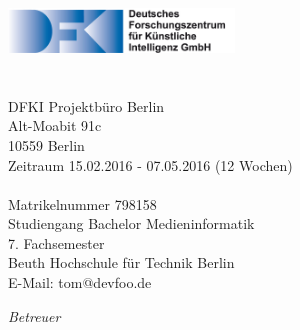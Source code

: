 \begin{titlepage}
	\tgherosfont
	\centering

	{\Large \thesisUniversity} \\[4mm]
	\includegraphics[width=6cm]{gfx/DFKI_Schrift_de} \\[2mm]
	\textsf{\thesisUniversityDepartment} \\
	\textsf{\thesisUniversityInstitute} \\[5mm]
    {\normalsize DFKI Projektbüro Berlin}\\
    {\normalsize Alt-Moabit 91c}\\
    {\normalsize 10559 Berlin}\\[5mm]
    {\small{Zeitraum 15.02.2016 - 07.05.2016 (12 Wochen)}}
	\vfill
	{\LARGE \color{ctcolortitle}\textbf{\thesisTitle}}\\[10mm]
	
	{\Large \thesisName} \\[5mm]
    {\normalsize Matrikelnummer 798158} \\
	{\normalsize Studiengang Bachelor Medieninformatik} \\
    {\normalsize 7. Fachsemester} \\
    {\normalsize Beuth Hochschule für Technik Berlin} \\[5mm]
	{\small E-Mail: tom@devfoo.de} \\

	\vfill
	\begin{minipage}[t]{.27\textwidth}
		\raggedleft
		\textit{Betreuer}
	\end{minipage}
	\hspace*{15pt}
	\begin{minipage}[t]{.65\textwidth}
		{\Large \thesisFirstReviewer} \\
	  	{\small \thesisFirstReviewerDepartment} \\[-1mm]
		{\small \thesisFirstReviewerUniversity}
	\end{minipage} \\[5mm]
	\begin{minipage}[t]{.27\textwidth}
		\raggedleft
		\textit{ }
	\end{minipage}
	\hspace*{15pt}
	\begin{minipage}[t]{.65\textwidth}
		{\Large \thesisSecondReviewer} \\
	  	{\small \thesisSecondReviewerDepartment} \\[-1mm]
		{\small \thesisSecondReviewerUniversity}
	\end{minipage} \\[10mm]
	\thesisDate \\
\end{titlepage}
